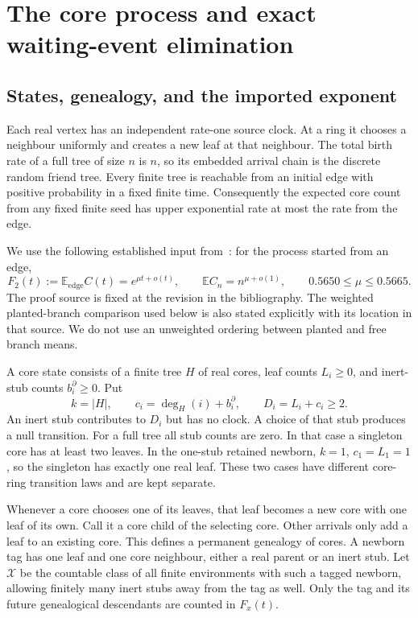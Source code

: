 \section{The core process and exact waiting-event elimination}
\label{model:section}

\subsection{States, genealogy, and the imported exponent}

Each real vertex has an independent rate-one source clock. At a ring it
chooses a neighbour uniformly and creates a new leaf at that neighbour.
The total birth rate of a full tree of size $n$ is $n$, so its embedded
arrival chain is the discrete random friend tree. Every finite tree is
reachable from an initial edge with positive probability in a fixed
finite time. Consequently the expected core count from any fixed
finite seed has upper exponential rate at most the rate from the edge.

We use the following established input from~\cite{Uzay}: for the
process started from an edge,
\begin{equation}\label{model:imported-exponent}
 F_2(t):=\mathbb E_{\mathrm{edge}}C(t)=e^{\mu t+o(t)},
 \qquad
 \mathbb E C_n=n^{\mu+o(1)},
 \qquad 0.5650\le\mu\le0.5665.
\end{equation}
The proof source is fixed at the revision in the bibliography. The
weighted planted-branch comparison used below is also stated explicitly
with its location in that source. We do not use an unweighted ordering
between planted and free branch means.

A core state consists of a finite tree $H$ of real cores, leaf counts
$L_i\ge0$, and inert-stub counts $b_i^\partial\ge0$. Put
\[
 k=|H|,\qquad c_i=\deg_H(i)+b_i^\partial,
 \qquad D_i=L_i+c_i\ge2.
\]
An inert stub contributes to $D_i$ but has no clock. A choice of that
stub produces a null transition. For a full tree all stub counts are
zero. In that case a singleton core has at least two leaves. In the
one-stub retained newborn, $k=1$, $c_1=L_1=1$, so the singleton has
exactly one real leaf. These two cases have different core-ring
transition laws and are kept separate.

Whenever a core chooses one of its leaves, that leaf becomes a new
core with one leaf of its own. Call it a core child of the selecting
core. Other arrivals only add a leaf to an existing core. This defines
a permanent genealogy of cores. A newborn tag has one leaf and one
core neighbour, either a real parent or an inert stub. Let $\mathcal X$
be the countable class of all finite environments with such a tagged
newborn, allowing finitely many inert stubs away from the tag as well.
Only the tag and its future genealogical descendants are counted in
$F_x(t)$.

